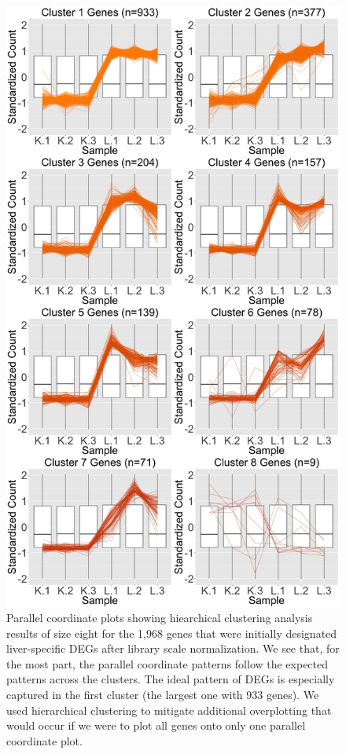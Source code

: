 \documentclass{article}
\begin{document}
\null
\begin{figure}[t!]
\centerline{\includegraphics[width=0.65\columnwidth]{../Bioinformatics/Pictures/liverKidney/Clustering_data_FDR_001_TMMvRaw_Orig/K_L_8.jpg}}
\caption{Parallel coordinate plots showing hiearchical clustering analysis results of size eight for the 1,968 genes that were initially designated liver-specific DEGs after library scale normalization. We see that, for the most part, the parallel coordinate patterns follow the expected patterns across the clusters. The ideal pattern of DEGs is especially captured in the first cluster (the largest one with 933 genes). We used hierarchical clustering to mitigate additional overplotting that would occur if we were to plot all genes onto only one parallel coordinate plot.
\label{OrigPCP}}
\end{figure}
\end{document}
